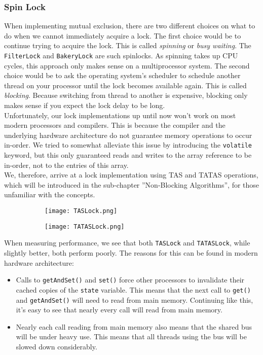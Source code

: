 \documentclass[main]{subfiles}
\begin{document}

\subsubsection{Spin Lock}
When implementing mutual exclusion, there are two different choices on what to do when we cannot immediately acquire a lock. The first choice would be to continue trying to acquire the lock. This is called \textit{spinning} or \textit{busy waiting}. The \texttt{FilterLock} and \texttt{BakeryLock} are such spinlocks. As spinning takes up CPU cycles, this approach only makes sense on a multiprocessor system. The second choice would be to ask the operating system's scheduler to schedule another thread on your processor until the lock becomes available again. This is called \textit{blocking}. Because switching from thread to another is expensive, blocking only makes sense if you expect the lock delay to be long.\\[3mm]
Unfortunately, our lock implementations up until now won't work on most modern processors and compilers. This is because the compiler and the underlying hardware architecture do not guarantee memory operations to occur in-order. We tried to  somewhat alleviate this issue by introducing the \texttt{volatile} keyword, but this only guaranteed reads and writes to the array reference to be in-order, not to the entries of this array.\\[3mm]
We, therefore, arrive at a lock implementation using TAS and TATAS operations, which will be introduced in the sub-chapter ''Non-Blocking Algorithms'', for those unfamiliar with the concepts.
\begin{figure}[h]
    \centering
    \begin{subfigure}{.5\textwidth}
        \centering
        \texttt{[image: TASLock.png]}
    \end{subfigure}%
    \begin{subfigure}{.5\textwidth}
        \centering
        \texttt{[image: TATASLock.png]}
    \end{subfigure}
\end{figure}
When measuring performance, we see that both \texttt{TASLock} and \texttt{TATASLock}, while slightly better, both perform poorly. The reasons for this can be found in modern hardware architecture:
\begin{itemize}
    \item Calls to \texttt{getAndSet()} and \texttt{set()} force other processors to invalidate their cached copies of the \texttt{state} variable. This means that the next call to \texttt{get()} and \texttt{getAndSet()} will need to read from main memory. Continuing like this, it's easy to see that nearly every call will read from main memory.
    \item Nearly each call reading from main memory also means that the shared bus will be under heavy use. This means that all threads using the bus will be slowed down considerably.
\end{itemize}
\end{document}
